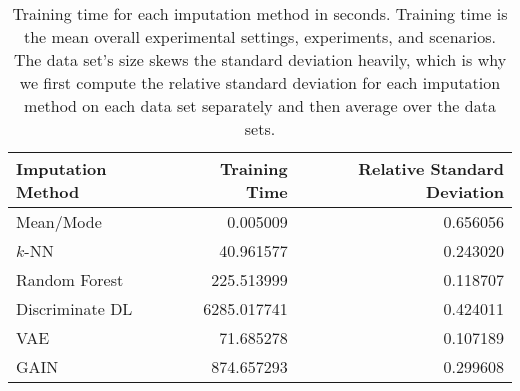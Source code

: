 \begin{table}
	\centering
	\begin{tabular}{lrr}
		\toprule
		Imputation Method &  Training Time &  Relative Standard Deviation \\
		\midrule
		Mean/Mode &       0.005009 &                     0.656056 \\
		$k$-NN &      40.961577 &                     0.243020 \\
		Random Forest &     225.513999 &                     0.118707 \\
		Discriminate DL &    6285.017741 &                     0.424011 \\
		VAE &      71.685278 &                     0.107189 \\
		GAIN &     874.657293 &                     0.299608 \\
		\bottomrule
	\end{tabular}
	\caption{Training time for each imputation method in seconds. Training time is the mean overall experimental settings, experiments, and scenarios. The data set's size skews the standard deviation heavily, which is why we first compute the relative standard deviation for each imputation method on each data set separately and then average over the data sets.}
	\label{tab:training_time}
\end{table}

